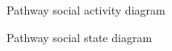 \documentclass{article}
\begin{document}
\begin{figure}[H]
    \centering
    \begin{center}
    \end{center}
    \caption{Pathway social activity diagram}
    \label{fig:my_label}
\end{figure}

\begin{figure}[H]
    \centering
    \begin{center}
    \end{center}
    \caption{Pathway social state diagram}
    \label{fig:my_label}
\end{figure}
\end{document}
